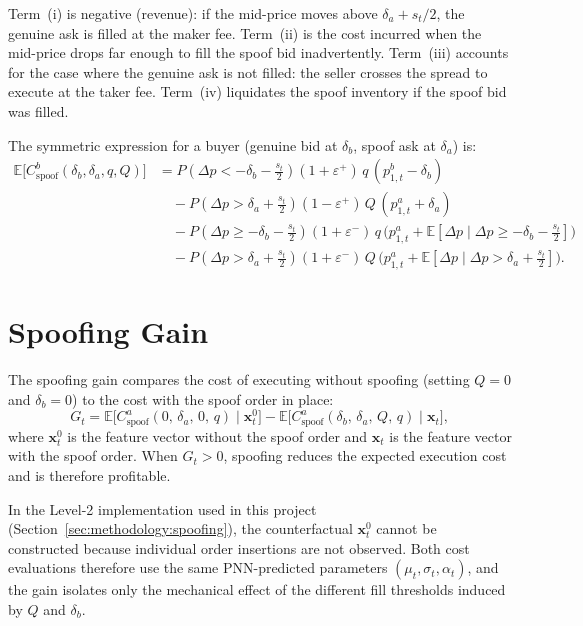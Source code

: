 \documentclass[11pt]{report}
\begin{document}
Term~(i) is negative (revenue): if the mid-price moves above $\delta_a + s_t/2$, the genuine ask is filled at the maker fee. Term~(ii) is the cost incurred when the mid-price drops far enough to fill the spoof bid inadvertently. Term~(iii) accounts for the case where the genuine ask is not filled: the seller crosses the spread to execute at the taker fee. Term~(iv) liquidates the spoof inventory if the spoof bid was filled.

The symmetric expression for a buyer (genuine bid at $\delta_b$, spoof ask at $\delta_a$) is:
\begin{align}
  \mathbb{E}\!\bigl[C^b_{\text{spoof}}(\delta_b, \delta_a, q, Q)\bigr]
  &= P\!\left(\Delta p < -\delta_b - \tfrac{s_t}{2}\right)(1 + \varepsilon^+)\, q\,(p^b_{1,t} - \delta_b) \nonumber \\[4pt]
  &\quad - P\!\left(\Delta p > \delta_a + \tfrac{s_t}{2}\right)(1 - \varepsilon^+)\, Q\,(p^a_{1,t} + \delta_a) \nonumber \\[4pt]
  &\quad - P\!\left(\Delta p \geq -\delta_b - \tfrac{s_t}{2}\right)(1 + \varepsilon^-)\, q\,\bigl(p^a_{1,t} + \mathbb{E}[\Delta p \mid \Delta p \geq -\delta_b - \tfrac{s_t}{2}]\bigr) \nonumber \\[4pt]
  &\quad - P\!\left(\Delta p > \delta_a + \tfrac{s_t}{2}\right)(1 + \varepsilon^-)\, Q\,\bigl(p^a_{1,t} + \mathbb{E}[\Delta p \mid \Delta p > \delta_a + \tfrac{s_t}{2}]\bigr).
  \label{eq:app_buyer_cost}
\end{align}

\section{Spoofing Gain}\label{app:spoofing:gain}

The spoofing gain compares the cost of executing without spoofing (setting $Q = 0$ and $\delta_b = 0$) to the cost with the spoof order in place:
\begin{equation}
  G_t = \mathbb{E}\!\bigl[C^a_{\text{spoof}}(0,\, \delta_a,\, 0,\, q) \mid \mathbf{x}^0_t\bigr] - \mathbb{E}\!\bigl[C^a_{\text{spoof}}(\delta_b,\, \delta_a,\, Q,\, q) \mid \mathbf{x}_t\bigr],
  \label{eq:app_gain}
\end{equation}
where $\mathbf{x}^0_t$ is the feature vector without the spoof order and $\mathbf{x}_t$ is the feature vector with the spoof order. When $G_t > 0$, spoofing reduces the expected execution cost and is therefore profitable.

In the Level-2 implementation used in this project (Section~\ref{sec:methodology:spoofing}), the counterfactual $\mathbf{x}^0_t$ cannot be constructed because individual order insertions are not observed. Both cost evaluations therefore use the same PNN-predicted parameters $(\mu_t, \sigma_t, \alpha_t)$, and the gain isolates only the mechanical effect of the different fill thresholds induced by $Q$ and $\delta_b$.
\end{document}

